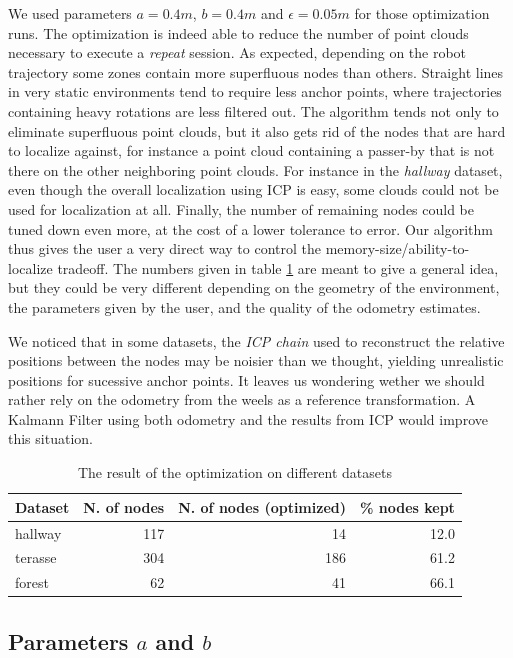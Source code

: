 \documentclass[letterpaper,10 pt,conference]{ieeeconf}
\begin{document}
We used parameters $a=0.4 m$, $b=0.4 m$ and $\epsilon=0.05 m$ for those optimization runs. The
optimization is indeed able to reduce the number of point clouds necessary to execute a
\textit{repeat} session. As expected, depending on the robot trajectory some zones contain more
superfluous nodes than others. Straight lines in very static environments tend to require less
anchor points, where trajectories containing heavy rotations are less filtered out. The algorithm
tends not only to eliminate superfluous point clouds, but it also gets rid of the nodes that are
hard to localize against, for instance a point cloud containing a passer-by that is not there on the
other neighboring point clouds. For instance in the \textit{hallway} dataset, even though the
overall localization using ICP is easy, some clouds could not be used for localization at all.
Finally, the number of remaining nodes could be tuned down even more, at the cost of a lower
tolerance to error. Our algorithm thus gives the user a very direct way to control the
memory-size/ability-to-localize tradeoff. The numbers given in table
\ref{tabopti} are meant to give a general idea, but they could be very different depending on the
geometry of the environment, the parameters given by the user, and the quality of the odometry
estimates.

We noticed that in some datasets, the \textit{ICP chain} used to reconstruct the relative positions
between the nodes may be noisier than we thought, yielding unrealistic positions for sucessive
anchor points. It leaves us wondering wether we should rather rely on the odometry from the weels as
a reference transformation. A Kalmann Filter using both odometry and the results
from ICP would improve this situation.

\begin{table}[h]
\centering
\begin{tabular}{|l|r|r|r|}
  \hline
Dataset & N. of nodes & N. of nodes (optimized) & \% nodes kept \\
\hline
  hallway & 117 & 14 & 12.0 \\
\hline
terasse & 304 & 186 & 61.2 \\
  \hline
forest & 62 & 41 & 66.1 \\
  \hline
\end{tabular}
\caption{The result of the optimization on different datasets}
\label{tabopti}
\end{table}


\subsection{Parameters $a$ and $b$}
\end{document}
